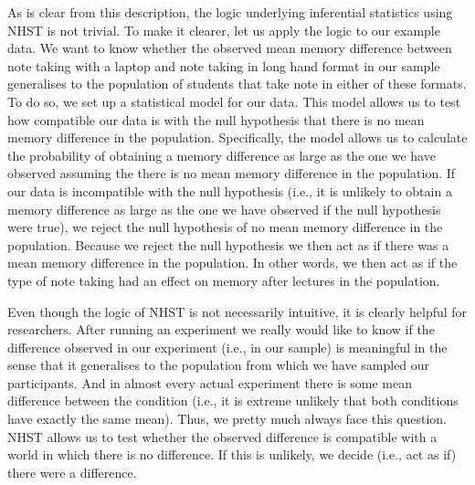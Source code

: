 \documentclass[
]{book}
\begin{document}
As is clear from this description, the logic underlying inferential statistics using NHST is not trivial. To make it clearer, let us apply the logic to our example data. We want to know whether the observed mean memory difference between note taking with a laptop and note taking in long hand format in our sample generalises to the population of students that take note in either of these formats. To do so, we set up a statistical model for our data. This model allows us to test how compatible our data is with the null hypothesis that there is no mean memory difference in the population. Specifically, the model allows us to calculate the probability of obtaining a memory difference as large as the one we have observed assuming the there is no mean memory difference in the population. If our data is incompatible with the null hypothesis (i.e., it is unlikely to obtain a memory difference as large as the one we have observed if the null hypothesis were true), we reject the null hypothesis of no mean memory difference in the population. Because we reject the null hypothesis we then act as if there was a mean memory difference in the population. In other words, we then act as if the type of note taking had an effect on memory after lectures in the population.

Even though the logic of NHST is not necessarily intuitive, it is clearly helpful for researchers. After running an experiment we really would like to know if the difference observed in our experiment (i.e., in our sample) is meaningful in the sense that it generalises to the population from which we have sampled our participants. And in almost every actual experiment there is some mean difference between the condition (i.e., it is extreme unlikely that both conditions have exactly the same mean). Thus, we pretty much always face this question. NHST allows us to test whether the observed difference is compatible with a world in which there is no difference. If this is unlikely, we decide (i.e., act as if) there were a difference.
\end{document}
